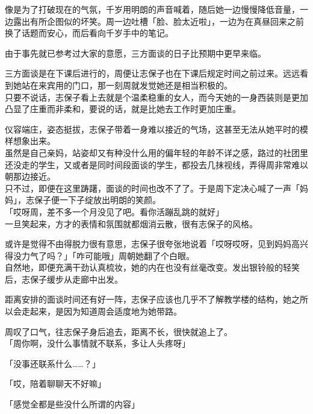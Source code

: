 像是为了打破现在的气氛，千岁用明朗的声音喊着，随后她一边慢慢降低音量，一边露出有所企图似的坏笑。周一边吐槽「脸、脸太近啦」，一边为在真昼回来之前换了话题而安心，而后看向千岁手中的笔记。\\

\vspace{2\baselineskip}

由于事先就已参考过大家的意愿，三方面谈的日子比预期中更早来临。

三方面谈是在下课后进行的，周便让志保子也在下课后规定时间之前过来。远远看到她站在来宾用的门口，那一刻周就发觉她还是相当积极的。\\

只要不说话，志保子看上去就是个温柔稳重的女人，而今天她的一身西装则是更加凸显了庄重而非柔和，要说的话，就是比她去工作时更加庄重。

仪容端庄，姿态挺拔，志保子带着一身难以接近的气场，这甚至无法从她平时的模样想象出来。\\

虽然是自己亲妈，站姿却又有种没什么用的偏年轻的年龄不详之感，路过的社团里还没走的学生，又或者是同时间段面谈的学生，都投去几抹视线，弄得周非常难以朝那边接近。\\

只不过，即便在这里踌躇，面谈的时间也改不了了。于是周下定决心喊了一声「妈妈」，志保子便一下子绽放出明朗的笑颜。\\

「哎呀周，差不多一个月没见了吧。看你活蹦乱跳的就好」\\

一旦笑起来，方才的表情和氛围就都烟消云散，很有志保子的风格。

或许是觉得不由得脱力很有意思，志保子很夸张地说着「哎呀哎呀，见到妈妈高兴得没力气了吗？」「咋可能哦」周朝她翻了个白眼。\\

自然地，即便充满干劲认真梳妆，她的内在也没有丝毫改变。发出银铃般的轻笑后，志保子缓步从走廊中出发。

距离安排的面谈时间还有好一阵，志保子应该也几乎不了解教学楼的结构，她之所以会走起来，是因为知道周会适度地为她带路。

周叹了口气，往志保子身后追去，距离不长，很快就追上了。\\

「周你啊，没什么事情就不联系，多让人头疼呀」

「没事还联系什么……？」

「哎，陪着聊聊天不好嘛」

「感觉全都是些没什么所谓的内容」

